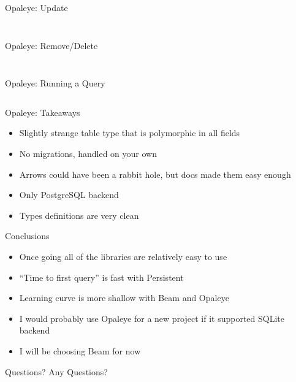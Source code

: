 \documentclass[hyperref={pdfpagelabels=false},12pt]{beamer}
\newcommand{\pygment}[3]{
  \inputminted[frame=single,framesep=2mm,linenos,fontsize=#1]{#2}{#3}
}
\newcommand{\pygmentLines}[5]{
  \inputminted[frame=single,framesep=2mm,linenos,fontsize=#1,firstline=#2,lastline=#3,autogobble]{#4}{#5}
}
\begin{document}
\begin{frame}{Opaleye: Update}
  \pygmentLines{\scriptsize}{113}{125}{haskell}{code/opaleye-example/src/Person.hs}
  \pygment{\scriptsize}{sql}{code/sql/updateSetWhereEmailAge.sql}
\end{frame}

\begin{frame}{Opaleye: Remove/Delete}
  \pygmentLines{\scriptsize}{88}{96}{haskell}{code/opaleye-example/src/Person.hs}
  \pygment{\scriptsize}{sql}{code/sql/deleteWhere.sql}
\end{frame}

\begin{frame}{Opaleye: Running a Query}
  \pygmentLines{\scriptsize}{26}{37}{haskell}{code/opaleye-example/test/Spec.hs}
\end{frame}

\begin{frame}{Opaleye: Takeaways}
  \begin{itemize}
    \item Slightly strange table type that is polymorphic in all fields
    \item No migrations, handled on your own
    \item Arrows could have been a rabbit hole, but docs made them easy enough
    \item Only PostgreSQL backend
    \item Types definitions are very clean
  \end{itemize}
\end{frame}

\begin{frame}{Conclusions}
  \begin{itemize}
    \item Once going all of the libraries are relatively easy to use
    \item ``Time to first query'' is fast with Persistent
    \item Learning curve is more shallow with Beam and Opaleye
    \item I would probably use Opaleye for a new project if it supported SQLite
      backend
    \item I will be choosing Beam for now
  \end{itemize}
\end{frame}

\begin{frame}{Questions?}
  \centering \Huge Any Questions?
\end{frame}
\end{document}

